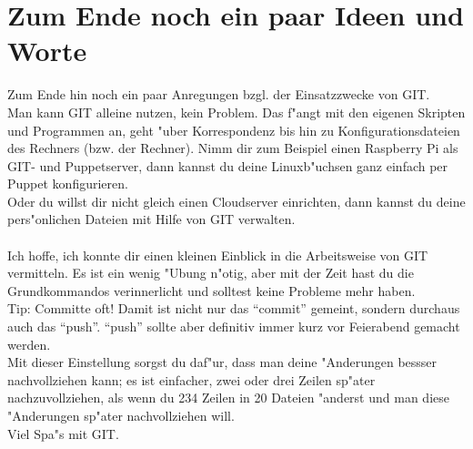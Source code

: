 \documentclass[german,a4paper]{report}
\begin{document}
\chapter{Zum Ende noch ein paar Ideen und Worte}
Zum Ende hin noch ein paar Anregungen bzgl. der Einsatzzwecke
von GIT.\\
Man kann GIT alleine nutzen, kein Problem. Das f"angt mit den
eigenen Skripten und Programmen an, geht "uber Korrespondenz
bis hin zu Konfigurationsdateien des Rechners (bzw. der Rechner).
Nimm dir zum Beispiel einen Raspberry Pi als GIT- und Puppetserver,
dann kannst du deine Linuxb"uchsen ganz einfach per Puppet
konfigurieren.\\
Oder du willst dir nicht gleich einen Cloudserver einrichten, dann
kannst du deine pers"onlichen Dateien mit Hilfe von GIT verwalten.\\
\\
Ich hoffe, ich konnte dir einen kleinen Einblick in die Arbeitsweise
von GIT vermitteln. Es ist ein wenig "Ubung n"otig, aber mit der Zeit
hast du die Grundkommandos verinnerlicht und solltest keine Probleme
mehr haben.\\
Tip: Committe oft! Damit ist nicht nur das ``commit'' gemeint, sondern
durchaus auch das ``push''. ``push'' sollte aber definitiv immer kurz
vor Feierabend gemacht werden.\\
Mit dieser Einstellung sorgst du daf"ur, dass man deine "Anderungen
bessser nachvollziehen kann; es ist einfacher, zwei oder drei Zeilen
sp"ater nachzuvollziehen, als wenn du 234 Zeilen in 20 Dateien
"anderst und man diese "Anderungen sp"ater nachvollziehen will.
\\
Viel Spa"s mit GIT.
\end{document}
